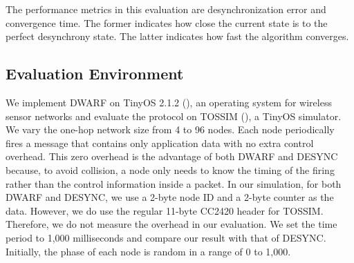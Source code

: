 The performance metrics in this evaluation are desynchronization error and convergence time. The former indicates how close the current state is to the perfect desynchrony state. The latter indicates how fast the algorithm converges.

\subsection{Evaluation Environment}
We implement DWARF on TinyOS 2.1.2 (\cite{levis-tinyos-04}), an operating system for wireless sensor networks
and evaluate the protocol on TOSSIM (\cite{levis-tossim-03}), a TinyOS simulator.
We vary the one-hop network size from 4 to 96 nodes.
Each node periodically fires a message that contains only application data with no extra control overhead.
This zero overhead is the advantage of both DWARF and DESYNC because, to avoid collision, a node only needs to know the timing of the firing rather than the control information inside a packet. 
In our simulation, for both DWARF and DESYNC, we use a 2-byte node ID and a 2-byte counter as the data. However, we do use the regular 11-byte CC2420 header for TOSSIM.
Therefore, we do not measure the overhead in our evaluation.
We set the time period to 1,000 milliseconds and compare our result with that of DESYNC.
Initially, the phase of each node is random in a range of 0 to 1,000.

